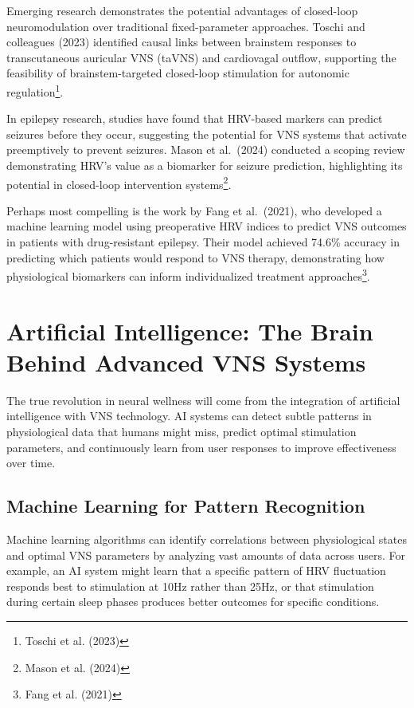 \documentclass[
  Letterpaper,
]{scrbook}
\begin{document}
Emerging research demonstrates the potential advantages of closed-loop
neuromodulation over traditional fixed-parameter approaches. Toschi and
colleagues (2023) identified causal links between brainstem responses to
transcutaneous auricular VNS (taVNS) and cardiovagal outflow, supporting
the feasibility of brainstem-targeted closed-loop stimulation for
autonomic regulation\footnote{Toschi et al. (2023)}.

In epilepsy research, studies have found that HRV-based markers can
predict seizures before they occur, suggesting the potential for VNS
systems that activate preemptively to prevent seizures. Mason et
al.~(2024) conducted a scoping review demonstrating HRV's value as a
biomarker for seizure prediction, highlighting its potential in
closed-loop intervention systems\footnote{Mason et al. (2024)}.

Perhaps most compelling is the work by Fang et al.~(2021), who developed
a machine learning model using preoperative HRV indices to predict VNS
outcomes in patients with drug-resistant epilepsy. Their model achieved
74.6\% accuracy in predicting which patients would respond to VNS
therapy, demonstrating how physiological biomarkers can inform
individualized treatment approaches\footnote{Fang et al. (2021)}.

\section{Artificial Intelligence: The Brain Behind Advanced VNS
Systems}\label{artificial-intelligence-the-brain-behind-advanced-vns-systems}

The true revolution in neural wellness will come from the integration of
artificial intelligence with VNS technology. AI systems can detect
subtle patterns in physiological data that humans might miss, predict
optimal stimulation parameters, and continuously learn from user
responses to improve effectiveness over time.

\subsection{Machine Learning for Pattern
Recognition}\label{machine-learning-for-pattern-recognition}

Machine learning algorithms can identify correlations between
physiological states and optimal VNS parameters by analyzing vast
amounts of data across users. For example, an AI system might learn that
a specific pattern of HRV fluctuation responds best to stimulation at
10Hz rather than 25Hz, or that stimulation during certain sleep phases
produces better outcomes for specific conditions.
\end{document}
